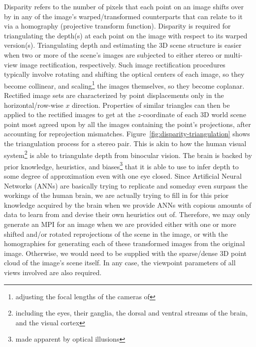 Disparity refers to the number of pixels that each point on an image shifts over by in any of the image's warped/transformed counterparts that can relate to it via a homography (projective transform function). Disparity is required for triangulating the depth(s) at each point on the image with respect to its warped version(s). Triangulating depth and estimating the 3D scene structure is easier when two or more of the scene's images are subjected to either stereo or multi-view image rectification, respectively. Such image rectification procedures typically involve rotating and shifting the optical centers of each image, so they become collinear, and scaling\footnote{adjusting the focal lengths of the cameras of} the images themselves, so they become coplanar. Rectified image sets are characterized by point displacements only in the horizontal/row-wise $x$ direction. Properties of similar triangles can then be applied to the rectified images to get at the $z$-coordinate of each 3D world scene point most agreed upon by all the images containing the point's projections, after accounting for reprojection mismatches. Figure~\ref{fig:disparity-triangulation} shows the triangulation process for a stereo pair. This is akin to how the human visual system\footnote{including the eyes, their ganglia, the dorsal and ventral streams of the brain, and the visual cortex} is able to triangulate depth from binocular vision. The brain is backed by prior knowledge, heuristics, and biases\footnote{made apparent by optical illusions} that it is able to use to infer depth to some degree of approximation even with one eye closed. Since Artificial Neural Networks (ANNs) are basically trying to replicate and someday even surpass the workings of the human brain, we are actually trying to fill in for this prior knowledge acquired by the brain when we provide ANNs with copious amounts of data to learn from and devise their own heuristics out of. Therefore, we may only generate an MPI for an image when we are provided either with one or more shifted and/or rotated reprojections of the scene in the image, or with the homographies for generating each of these transformed images from the original image. Otherwise, we would need to be supplied with the sparse/dense 3D point cloud of the image's scene itself. In any case, the viewpoint parameters of all views involved are also required.